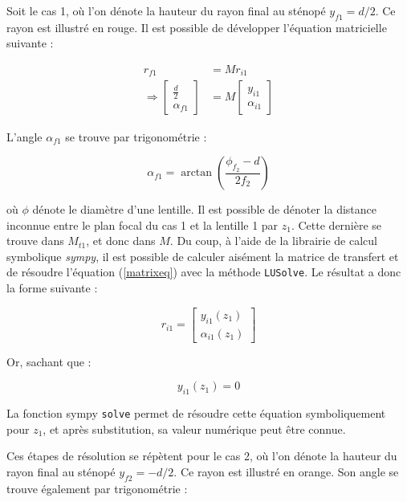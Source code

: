 \documentclass[11pt,letterpaper]{article}
\begin{document}
Soit le cas 1, où l'on dénote la hauteur du rayon final au sténopé $y_{f1} = d/2$. Ce rayon est illustré
en rouge. Il est possible de développer l'équation matricielle suivante :

\begin{align}
  r_{f1}&= M r_{i1}\label{matrixeq}\\
  \Rightarrow\begin{bmatrix}
    \frac{d}{2}  \\
    \alpha_{f1}
  \end{bmatrix} &= 
  M \begin{bmatrix}
    y_{i1} \\
    \alpha_{i1}
  \end{bmatrix}
\end{align}

L'angle $\alpha_{f1}$ se trouve par trigonométrie :

\begin{equation}
  \alpha_{f1}= \arctan\left( \frac{\phi_{f_{2}}-d}{2f_{2}} \right)
\end{equation}

où $\phi$ dénote le diamètre d'une lentille. Il est possible de dénoter la distance inconnue entre
le plan focal du cas 1 et la lentille 1 par $z_{1}$. Cette dernière se trouve dans $M_{t1}$, et donc
dans $M$. Du coup, à l'aide de la librairie de calcul symbolique \textit{sympy}, il est possible de
calculer aisément la matrice de transfert et de résoudre l'équation (\ref{matrixeq}) avec la méthode
\texttt{LUSolve}. Le résultat a donc la forme suivante :

\begin{equation}
  r_{i1}= \begin{bmatrix}
   y_{i1}(z_{1})  \\
    \alpha_{i1}(z_{1})
  \end{bmatrix}
\end{equation}

Or, sachant que :

\begin{equation}
  y_{i1}(z_{1})=0
\end{equation}

La fonction sympy \texttt{solve} permet de résoudre cette équation symboliquement pour $z_{1}$, et
après substitution, sa valeur numérique peut être connue.

Ces étapes de résolution se répètent pour le cas 2, où l'on dénote la hauteur du rayon final au 
sténopé $y_{f2} = -d/2$. Ce rayon est illustré en orange. Son angle se trouve également par trigonométrie :
\end{document}
